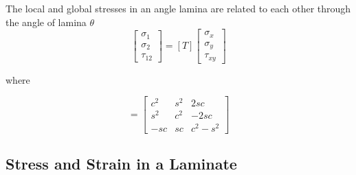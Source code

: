\documentclass[smallextended]{svjour3}       %
\begin{document}
The local and global stresses in an angle lamina are related to each other through the angle of
lamina $\theta$
\begin{equation}
	\left[\begin{array}{l}\sigma_{1} \\ \sigma_{2} \\ \tau_{12
			}\end{array}\right]=[T]\left[\begin{array}{l}\sigma_{x} \\ \sigma_{y} \\
	\tau_{xy}\end{array}\right]
\end{equation}

where 

\begin{equation}
	[T]=\left[\begin{array}{ccc}c^{2} & s^{2} & 2 s c \\ s^{2} & c^{2} & -2 s c \\ -s c & s c &
	c^{2}-s^{2}\end{array}\right]
\end{equation}

\subsection{Stress and Strain in a Laminate}
\end{document}
